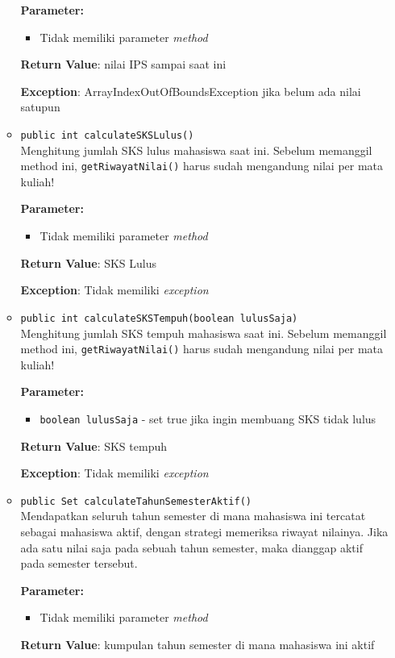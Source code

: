 \documentclass{article}
\begin{document}
\begin{enumerate}
\begin{itemize}
\textbf{Parameter:}\begin{itemize}
\item Tidak memiliki parameter \textit{method}
\end{itemize}
\textbf{Return Value}: nilai IPS sampai saat ini

\textbf{Exception}: ArrayIndexOutOfBoundsException jika belum ada nilai satupun

\item \texttt{public int calculateSKSLulus()}\\ 
Menghitung jumlah SKS lulus mahasiswa saat ini.
 Sebelum memanggil method ini, \texttt{getRiwayatNilai()} harus sudah mengandung nilai per mata kuliah!

\textbf{Parameter:}\begin{itemize}
\item Tidak memiliki parameter \textit{method}
\end{itemize}
\textbf{Return Value}: SKS Lulus

\textbf{Exception}: Tidak memiliki \textit{exception}

\item \texttt{public int calculateSKSTempuh(boolean lulusSaja)}\\ 
Menghitung jumlah SKS tempuh mahasiswa saat ini.
 Sebelum memanggil method ini, \texttt{getRiwayatNilai()} harus sudah mengandung nilai per mata kuliah!

\textbf{Parameter:}
\begin{itemize}
\item \texttt{boolean lulusSaja} - 
set true jika ingin membuang SKS tidak lulus
\end{itemize}
\textbf{Return Value}: SKS tempuh

\textbf{Exception}: Tidak memiliki \textit{exception}

\item \texttt{public Set calculateTahunSemesterAktif()}\\ 
Mendapatkan seluruh tahun semester di mana mahasiswa ini tercatat
 sebagai mahasiswa aktif, dengan strategi memeriksa riwayat nilainya.
 Jika ada satu nilai saja pada sebuah tahun semester, maka dianggap
 aktif pada semester tersebut.

\textbf{Parameter:}\begin{itemize}
\item Tidak memiliki parameter \textit{method}
\end{itemize}
\textbf{Return Value}: kumpulan tahun semester di mana mahasiswa ini aktif


\end{itemize}
\end{enumerate}
\end{document}

